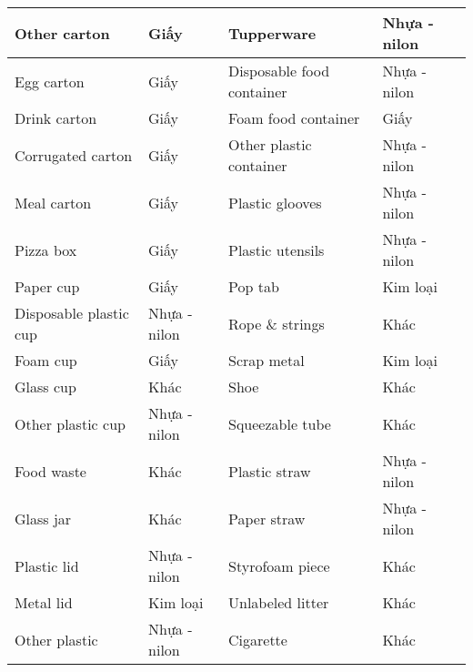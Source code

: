 \documentclass[../the.tex]{subfiles}
\begin{document}
\begin{table}[!h]
\begin{tabular}{|l|l|l|l|}
		Other carton           & Giấy                                  & Tupperware                & Nhựa - nilon \\ \hline
		Egg carton             & Giấy                                  & Disposable food container & Nhựa - nilon \\ \hline
		Drink carton           & Giấy                                  & Foam food container       & Giấy         \\ \hline
		Corrugated carton      & Giấy                                  & Other plastic container   & Nhựa - nilon \\ \hline
		Meal carton            & Giấy                                  & Plastic glooves           & Nhựa - nilon \\ \hline
		Pizza box              & Giấy                                  & Plastic utensils          & Nhựa - nilon \\ \hline
		Paper cup              & Giấy                                  & Pop tab                   & Kim loại     \\ \hline
		Disposable plastic cup & Nhựa - nilon                          & Rope \& strings           & Khác         \\ \hline
		Foam cup               & Giấy                                  & Scrap metal               & Kim loại     \\ \hline
		Glass cup              & Khác                                  & Shoe                      & Khác         \\ \hline
		Other plastic cup      & Nhựa - nilon                          & Squeezable tube           & Khác         \\ \hline
		Food waste             & Khác                                  & Plastic straw             & Nhựa - nilon \\ \hline
		Glass jar              & Khác                                  & Paper straw               & Nhựa - nilon \\ \hline
		Plastic lid            & Nhựa - nilon                          & Styrofoam piece           & Khác         \\ \hline
		Metal lid              & Kim loại                              & Unlabeled litter          & Khác         \\ \hline
		Other plastic          & Nhựa - nilon                          & Cigarette                 & Khác         \\ \hline
	\end{tabular}
	\label{tab:taco_map}
\end{table}
\end{document}
